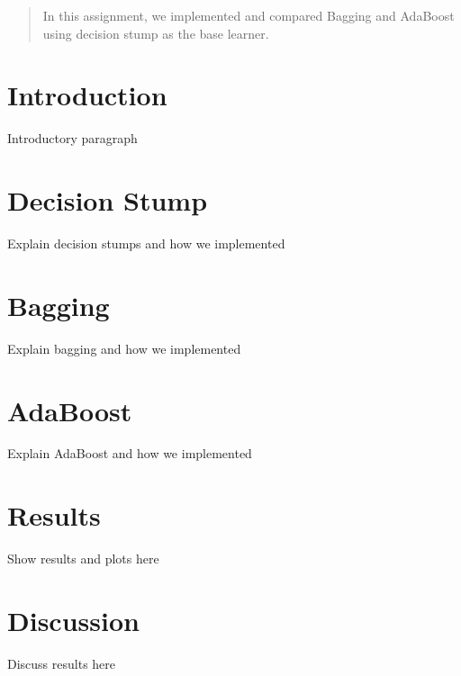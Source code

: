 \documentclass[12pt]{article}
\begin{document}
\maketitle

\begin{abstract}
In this assignment, we implemented and compared Bagging and AdaBoost using decision stump as the base learner.
\end{abstract}

\section{Introduction}
Introductory paragraph

\section{Decision Stump}
Explain decision stumps and how we implemented

\section{Bagging}
Explain bagging and how we implemented

\section{AdaBoost}
Explain AdaBoost and how we implemented

\section{Results}
Show results and plots here

\section{Discussion}
Discuss results here

%
%
\end{document}
